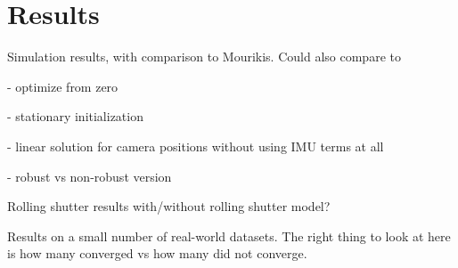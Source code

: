 \section{Results}

Simulation results, with comparison to Mourikis. Could also compare to

- optimize from zero

- stationary initialization

- linear solution for camera positions without using IMU terms at all

- robust vs non-robust version

Rolling shutter results with/without rolling shutter model?

Results on a small number of real-world datasets. The right thing to look at here is how many converged vs how many did not converge.
